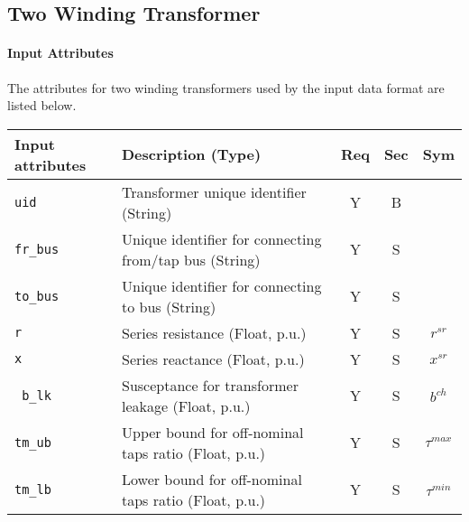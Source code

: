 \documentclass{article}
\begin{document}
\subsection{Two Winding Transformer}
\label{nom:transformer}

\paragraph{Input Attributes}
The attributes for two winding transformers used by the
input data format are listed below.

\begin{center}
\small
\begin{tabular}{ l | l | c | c | c |}
Input attributes & Description (Type) & Req & Sec & Sym\\
\hline
  {\tt uid} & Transformer unique identifier (String)& Y & B & \\
  {\tt fr\_bus} & Unique identifier for connecting from/tap bus (String)& Y & S & \\
  {\tt to\_bus} & Unique identifier for connecting to bus (String)& Y & S & \\
  {\tt r} & Series resistance (Float, p.u.)& Y & S & $r^{sr}$\\
  {\tt x} & Series reactance  (Float, p.u.)& Y & S & $x^{sr}$\\
  {\tt\color{red} b\_lk} & Susceptance for transformer leakage (Float, p.u.)& Y & S & $b^{ch}$ \\
  {\tt tm\_ub} & Upper bound for off-nominal taps ratio (Float, p.u.)& Y & S & $\tau^{max}$\\
  {\tt tm\_lb} & Lower bound for off-nominal taps ratio (Float, p.u.)& Y & S & $\tau^{min}$\\

\end{tabular}
\end{center}
\end{document}
